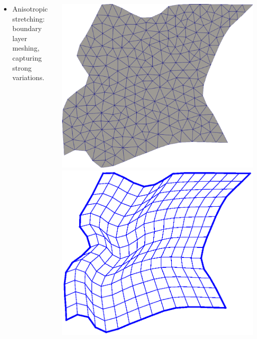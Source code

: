 \documentclass[compress,10pt,aspectratio=169]{beamer}
\begin{document}
\begin{frame}
\begin{columns}
\begin{column}{0.8\textwidth}
\begin{itemize}
\item {\color{onera} Anisotropic stretching:} boundary layer meshing, capturing strong variations.\\\vspace{0.25cm}
\end{itemize}
    \end{column}
    \begin{column}{0.24\textwidth}
        \centering
        \includegraphics[scale=0.11]{images/zone4beamer.pdf}
        \includegraphics[scale=0.35]{images/mesh_zone4.eps}
    \end{column}
\end{columns}
\end{frame}
\end{document}
